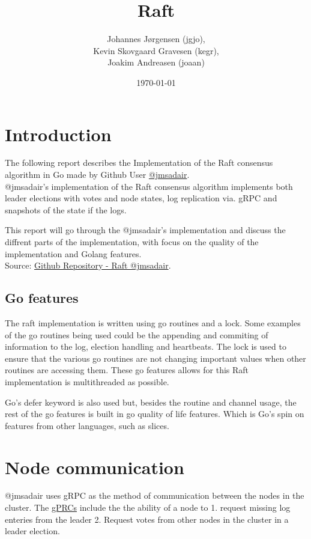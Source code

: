 \documentclass[a4paper,11pt]{article}
\title{Raft}
\author{Johannes Jørgensen (jgjo),\\ Kevin Skovgaard Gravesen (kegr),\\ Joakim Andreasen (joaan)}
\date{\today}
\begin{document}
 

\maketitle

\section*{Introduction}
The following report describes the Implementation of the Raft consensus algorithm in Go made by Github User \href{https://github.com/jmsadair/}{@jmsadair}.
\\@jmsadair's implementation of the Raft consensus algorithm implements both leader elections with votes and node states, log replication via. gRPC and snapshots of the state if the logs.

This report will go through the @jmsadair's implementation and discuss the diffrent parts of the implementation, with focus on the quality of the implementation and Golang features.
\\

Source: \href{https://github.com/jmsadair/raft}{Github Repository - Raft @jmsadair}.
\subsection*{Go features}
The raft implementation is written using go routines and a lock.
Some examples of the go routines being used could be the appending and commiting of information to the log, election handling and heartbeats.
The lock is used to ensure that the various go routines are not changing important values when other routines are accessing them.
These go features allows for this Raft implementation is multithreaded as possible.

Go's defer keyword is also used but, besides the routine and channel usage, the rest of the go features is built in go quality of life features.
Which is Go's spin on features from other languages, such as slices.
\\
\section*{Node communication}
@jmsadair uses gRPC as the method of communication between the nodes in the cluster. The \href{https://github.com/jmsadair/raft/blob/dev/internal/protobuf/raft.proto}{gPRCs} include the the ability of a node to 1. request missing log enteries from the leader 2. Request votes from other nodes in the cluster in a leader election. 
\end{document}
